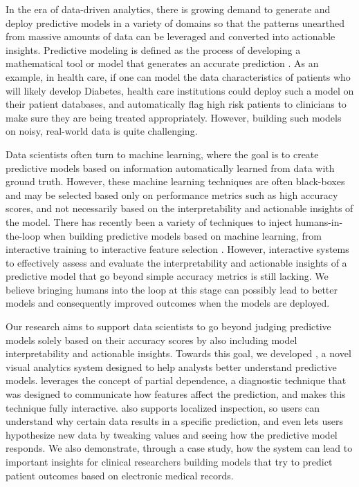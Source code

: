 

In the era of data-driven analytics, there is growing demand to generate and deploy predictive models in a variety of domains so that the patterns unearthed from massive amounts of data can be leveraged
and converted into actionable insights.
Predictive modeling is defined as the process of developing a mathematical tool or model that generates an accurate prediction \cite{kuhn2013applied}.  As an example, in health care, if one can model the data characteristics of patients who will likely develop Diabetes, health care institutions could deploy such a model on their patient databases, and automatically flag high risk patients to clinicians to make sure they are being treated appropriately.  However, building such models on noisy, real-world data is quite challenging.  

Data scientists often turn to machine learning, where the goal is to create predictive models based on information automatically learned from data with ground truth.  However, these machine learning techniques are often black-boxes and may be selected based only on performance metrics such as high accuracy scores, and not necessarily based on the interpretability and actionable insights of the model.  There has recently been a variety of techniques to inject humans-in-the-loop when building predictive models based on machine learning, from interactive training \cite{amershi15} to interactive feature selection \cite{infuse}.  However, interactive systems to effectively assess and evaluate the interpretability and actionable insights of a predictive model that go beyond simple accuracy metrics is still lacking.  We believe bringing humans into the loop at this stage can possibly lead to better models and consequently improved outcomes when the models are deployed.

Our research aims to support data scientists to go beyond judging predictive models solely based on their accuracy scores by also including model interpretability and actionable insights.  Towards this goal, we developed \prospector, a novel visual analytics system designed to help analysts better understand  predictive models.  \prospector leverages the concept of partial dependence, a diagnostic technique that was designed to communicate how features affect the prediction, and makes this technique fully interactive.  \prospector also supports localized inspection, so users can understand why certain data results in a specific prediction, and even lets users hypothesize new data by tweaking values and seeing how the predictive model responds.  We also demonstrate, through a case study, how the system can lead to important insights for clinical researchers building models that try to predict patient outcomes based on electronic medical records.


